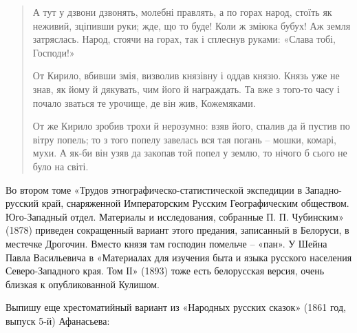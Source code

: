 \begin{quotation}
А тут у дзвони дзвонять, молебні правлять, а по горах народ, стоїть як неживий, зціпивши руки; жде, що то буде! Коли ж зміюка бубух! Аж земля затряслась. Народ, стоячи на горах, так і сплеснув руками: «Слава тобі, Господи!»

От Кирило, вбивши змія, визволив князівну і оддав князю. Князь уже не знав, як йому й дякувать, чим його й награждать. Та вже з того-то часу і почало зваться те урочище, де він жив, Кожемяками.

От же Кирило зробив трохи й нерозумно: взяв його, спалив да й пустив по вітру попель; то з того попелу завелась вся тая погань – мошки, комарі, мухи. А як-би він узяв да закопав той попел у землю, то нічого б сього не було на світі.
\end{quotation}

Во втором томе «Трудов этнографическо-статистичес\-кой экспедиции в Западно-русский край, снаряженной Императорским Русским Географическим обществом. Юго-Западный отдел. Материалы и исследования, собранные П. П. Чубинским» (1878) приведен сокращенный вариант этого предания, записанный в Белоруси, в местечке Дрогочин. Вместо князя там господин помельче – «пан». У Шейна Павла Васильевича в «Материалах для изучения быта и языка русского населения Северо-Западного края. Том ІІ» (1893) тоже есть белорусская версия, очень близкая к опубликованной Кулишом.

Выпишу еще хрестоматийный вариант из «Народных русских сказок» (1861 год, выпуск 5-й) Афанасьева:

